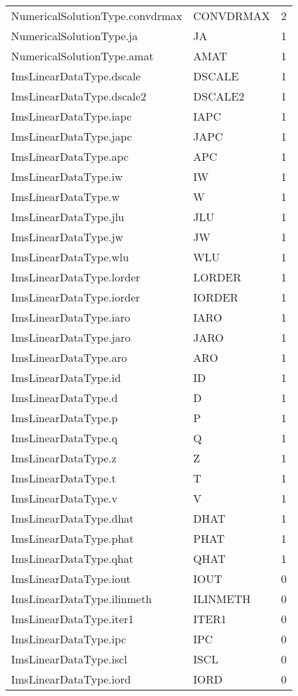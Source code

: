 \begin{longtable}{p{6cm} p{4cm} p{2cm} }
NumericalSolutionType.convdrmax &  CONVDRMAX & 2 \\ 
NumericalSolutionType.ja &  JA & 1 \\ 
NumericalSolutionType.amat &  AMAT & 1 \\ 
ImsLinearDataType.dscale &  DSCALE & 1 \\ 
ImsLinearDataType.dscale2 &  DSCALE2 & 1 \\ 
ImsLinearDataType.iapc &  IAPC & 1 \\ 
ImsLinearDataType.japc &  JAPC & 1 \\ 
ImsLinearDataType.apc &  APC & 1 \\ 
ImsLinearDataType.iw &  IW & 1 \\ 
ImsLinearDataType.w &  W & 1 \\ 
ImsLinearDataType.jlu &  JLU & 1 \\ 
ImsLinearDataType.jw &  JW & 1 \\ 
ImsLinearDataType.wlu &  WLU & 1 \\ 
ImsLinearDataType.lorder &  LORDER & 1 \\ 
ImsLinearDataType.iorder &  IORDER & 1 \\ 
ImsLinearDataType.iaro &  IARO & 1 \\ 
ImsLinearDataType.jaro &  JARO & 1 \\ 
ImsLinearDataType.aro &  ARO & 1 \\ 
ImsLinearDataType.id &  ID & 1 \\ 
ImsLinearDataType.d &  D & 1 \\ 
ImsLinearDataType.p &  P & 1 \\ 
ImsLinearDataType.q &  Q & 1 \\ 
ImsLinearDataType.z &  Z & 1 \\ 
ImsLinearDataType.t &  T & 1 \\ 
ImsLinearDataType.v &  V & 1 \\ 
ImsLinearDataType.dhat &  DHAT & 1 \\ 
ImsLinearDataType.phat &  PHAT & 1 \\ 
ImsLinearDataType.qhat &  QHAT & 1 \\ 
ImsLinearDataType.iout &  IOUT & 0 \\ 
ImsLinearDataType.ilinmeth &  ILINMETH & 0 \\ 
ImsLinearDataType.iter1 &  ITER1 & 0 \\ 
ImsLinearDataType.ipc &  IPC & 0 \\ 
ImsLinearDataType.iscl &  ISCL & 0 \\ 
ImsLinearDataType.iord &  IORD & 0 \\ 

\end{longtable}
